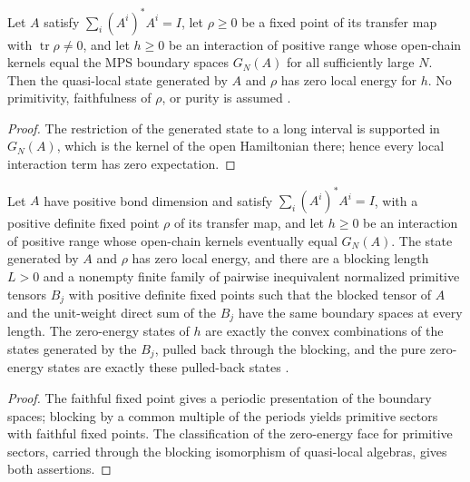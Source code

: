 \begin{lemma}
    \label{thm:stationary_state_zero_local_energy}
    \leanok
    Let $A$ satisfy $\sum_i(A^i)^*A^i=I$, let $\rho\geq0$ be a fixed point
    of its transfer map with $\operatorname{tr}\rho\neq0$, and let $h\geq0$
    be an interaction of positive range whose open-chain kernels equal the
    MPS boundary spaces $G_N(A)$ for all sufficiently large $N$. Then the
    quasi-local state generated by $A$ and $\rho$ has zero local energy for
    $h$. No primitivity, faithfulness of $\rho$, or purity is assumed
    \cite[Theorems~1.1--1.2]{Nachtergaele1996Spectral}.
\end{lemma}
\begin{proof}\leanok
    The restriction of the generated state to a long interval is supported
    in $G_N(A)$, which is the kernel of the open Hamiltonian there; hence
    every local interaction term has zero expectation.
\end{proof}

\begin{lemma}
    \label{thm:faithful_generators_ground_state_face}
    \leanok
    Let $A$ have positive bond dimension and satisfy $\sum_i(A^i)^*A^i=I$,
    with a positive definite fixed
    point $\rho$ of its transfer map, and let $h\geq0$ be an interaction of
    positive range whose open-chain kernels eventually equal $G_N(A)$.
    The state generated by $A$ and $\rho$ has zero local energy, and there are a blocking length $L>0$ and a nonempty finite family of
    pairwise inequivalent normalized primitive tensors $B_j$ with positive
    definite fixed points such that the blocked tensor of $A$ and the
    unit-weight direct sum of the $B_j$ have the same boundary spaces at
    every length. The zero-energy states of $h$ are exactly the convex
    combinations of the states generated by the $B_j$, pulled back
    through the blocking, and the pure zero-energy states are exactly these
    pulled-back states \cite[Theorems~1.1--1.2]{Nachtergaele1996Spectral}.
\end{lemma}
\begin{proof}\leanok
    The faithful fixed point gives a periodic presentation of the boundary
    spaces; blocking by a common multiple of the periods yields primitive
    sectors with faithful fixed points. The classification of the
    zero-energy face for primitive sectors, carried through the
    blocking isomorphism of quasi-local algebras, gives both assertions.
\end{proof}

